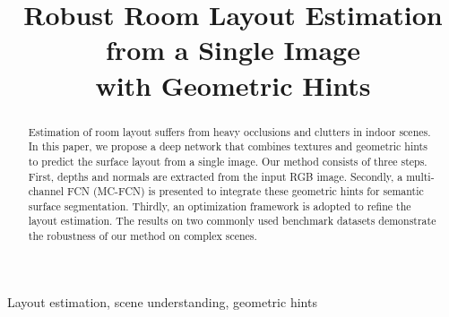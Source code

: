 \documentclass{article}
\title{Robust Room Layout Estimation from a Single Image \\ with Geometric Hints}
\begin{document}
%
\maketitle
%
\begin{abstract}
Estimation of room layout suffers from heavy occlusions and clutters in indoor scenes.
%
In this paper, we propose a deep network that combines textures and geometric hints to predict the surface layout from a single image.
%
Our method consists of three steps. First, depths and normals are extracted from the input RGB image. Secondly, a multi-channel FCN (MC-FCN) is presented to integrate these geometric hints for semantic surface segmentation. Thirdly, an optimization framework is adopted to refine the layout estimation. 
The results on two commonly used benchmark datasets demonstrate the robustness of our method on complex scenes. 
	
\end{abstract}
%
\begin{keywords}
Layout estimation, scene understanding, geometric hints
\end{keywords}
%






 

 


\end{document}
